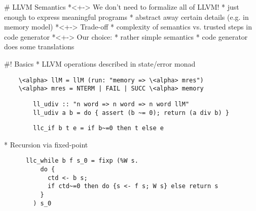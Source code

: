 \documentclass[fleqn]{beamer}
\begin{document}
%
%


\renewcommand{\insertsectitle}{\color{green}{Kernel}}


# LLVM Semantics
  *<+-> We don't need to formalize all of LLVM!
    * just enough to express meaningful programs
    * abstract away certain details (e.g. in memory model)
  *<+-> Trade-off
    * complexity of semantics vs. trusted steps in code generator
  *<+-> Our choice:
    * rather simple semantics
    * code generator does some translations

#! Basics
  * LLVM operations described in state/error monad
    \begin{lstlisting}
    \<alpha> llM = llM (run: "memory => \<alpha> mres")
    \<alpha> mres = NTERM | FAIL | SUCC \<alpha> memory
    \end{lstlisting}

    \pause

      \begin{lstlisting}
        ll_udiv :: "n word => n word => n word llM"
        ll_udiv a b = do { assert (b ~= 0); return (a div b) }
      \end{lstlisting}

    \pause

      \begin{lstlisting}
        llc_if b t e = if b~=0 then t else e
      \end{lstlisting}

    \pause

  * Recursion via fixed-point
    \begin{lstlisting}
      llc_while b f s_0 = fixp (%W s.
          do {
            ctd <- b s;
            if ctd~=0 then do {s <- f s; W s} else return s
          }
        ) s_0
    \end{lstlisting}



%



%
\end{document}
